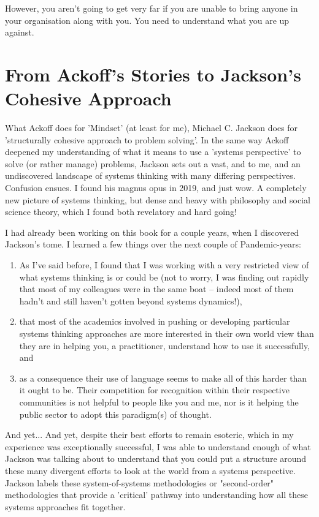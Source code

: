 However, you aren't going to get very far if you are unable to bring anyone in your organisation along with you. You need to understand what you are up against.

\section{From Ackoff's Stories to Jackson's Cohesive Approach}

What Ackoff does for 'Mindset' (at least for me), Michael C. Jackson does for 'structurally cohesive approach to problem solving'. In the same way Ackoff deepened my understanding of what it means to use a 'systems perspective' to solve (or rather manage) problems, Jackson sets out a vast, and to me, and an undiscovered landscape of systems thinking with many differing perspectives. Confusion ensues. I found his magnus opus in 2019, and just wow.\cite{Jackson2019} A completely new picture of systems thinking, but dense and heavy with philosophy and social science theory, which I found both revelatory and hard going!

I had already been working on this book for a couple years, when I discovered Jackson's tome. I learned a few things over the next couple of Pandemic-years: 
\begin{enumerate}
	\item As I've said before, I found that I was working with a very restricted view of what systems thinking is or could be (not to worry, I was finding out rapidly that most of my colleagues were in the same boat -- indeed most of them hadn't and still haven't gotten beyond systems dynamics!),
	\item that most of the academics involved in pushing or developing particular systems thinking approaches are more interested in their own world view than they are in helping you, a practitioner, understand how to use it successfully, and
	\item as a consequence their use of language seems to make all of this harder than it ought to be. Their competition for recognition within their respective communities is not helpful to people like you and me, nor is it helping the public sector to adopt this paradigm(s) of thought.
\end{enumerate}

And yet... And yet, despite their best efforts to remain esoteric, which in my experience was exceptionally successful, I was able to understand enough of what Jackson was talking about to understand that you could put a structure around these many divergent efforts to look at the world from a systems perspective. Jackson labels these system-of-systems methodologies or "second-order" methodologies that provide a 'critical' pathway into understanding how all these systems approaches fit together.

